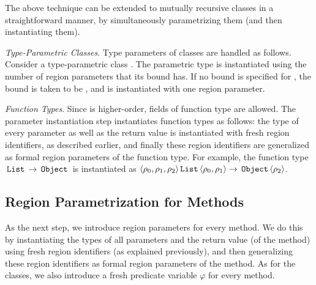 The above technique can be extended to mutually recursive classes in a
straightforward manner, by simultaneously parametrizing them (and
then instantiating them).

\emph{Type-Parametric Classes}.
Type parameters of classes are handled as follows.
Consider a type-parametric class .
The parametric type  is instantiated using the number of region parameters
that its bound  has. If no bound is specified for , the bound is taken
to be , and  is instantiated with one region parameter.

\emph{Function Types}.
Since \FB{} is higher-order, fields of function type are allowed. The parameter instantiation step
instantiates function types as follows: the type of every parameter as well as the return value is
instantiated with fresh region identifiers, as described earlier, and finally these region identifiers
are generalized as formal region parameters of the function type.
For example, the function type $\,{\tt List}\, \rightarrow \,{\tt Object}\,$ is instantiated as
$\langle \rho_0, \rho_1, \rho_2 \rangle \,{\tt List}\, \langle \rho_0,\rho_1 \rangle \rightarrow \,{\tt Object}\,\langle \rho_2 \rangle$.


\subsection{Region Parametrization for Methods}

As the next step, we introduce region parameters for every method.
We do this by instantiating the types of all parameters and the
return value (of the method) using fresh region identifiers (as explained previously),
and then generalizing these region identifiers as formal region parameters
of the method. As for the classes, we also introduce a fresh predicate variable
$\varphi$ for every method.

